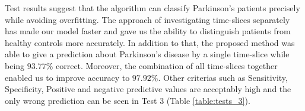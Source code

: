 \documentclass[preprint,12pt]{elsarticle}
\begin{document}
Test results suggest that the algorithm can classify Parkinson's patients precisely while avoiding overfitting. The approach of investigating time-slices separately has made our model faster and gave us the ability to distinguish patients from healthy controls more accurately. In addition to that, the proposed method was able to give a prediction about Parkinson's disease by a single time-slice while being $93.77\%$ correct. Moreover, the combination of all time-slices together enabled us to improve accuracy to $97.92\%$. Other criterias such as Sensitivity, Specificity, Positive and negative predictive values are acceptably high and the only wrong prediction can be seen in Test 3 (Table \ref{table:tests_3}).



\begin{table}
	\caption{Test results for experiment 1. HC (Positive) stands for Health Control while P (Negative) means Parkinson's disease.}
\end{table}
\end{document}
